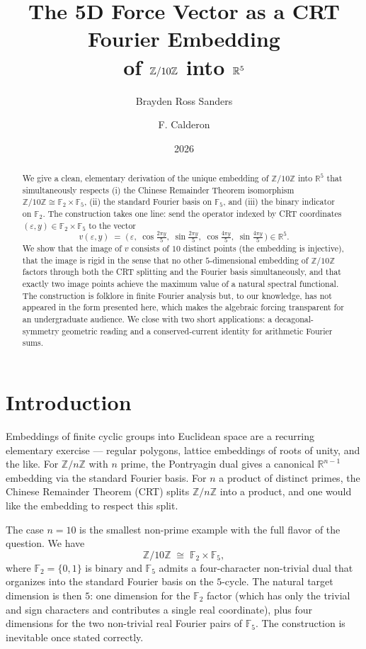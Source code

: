 \documentclass[11pt,reqno]{amsart}
\title[5D Fourier Embedding of \texorpdfstring{$\Z/10\Z$}{Z/10Z}]
  {The 5D Force Vector as a CRT Fourier Embedding\\
   of $\Z/10\Z$ into $\R^5$}
\author{Brayden Ross Sanders}
\author{F. Calderon}
\date{2026}
\theoremstyle{definition}
\newcommand{\Z}{\mathbb{Z}}
\newcommand{\R}{\mathbb{R}}
\newcommand{\F}{\mathbb{F}}
\begin{document}
\begin{abstract}
We give a clean, elementary derivation of the unique embedding of
$\Z/10\Z$ into $\R^5$ that simultaneously respects (i) the Chinese
Remainder Theorem isomorphism $\Z/10\Z \cong \F_2 \times \F_5$, (ii)
the standard Fourier basis on $\F_5$, and (iii) the binary indicator
on $\F_2$. The construction takes one line: send the operator
indexed by CRT coordinates $(\varepsilon, y) \in \F_2 \times \F_5$
to the vector
\[ v(\varepsilon, y) \;=\;
   \bigl(\,\varepsilon,\;
   \cos\tfrac{2\pi y}{5},\;\sin\tfrac{2\pi y}{5},\;
   \cos\tfrac{4\pi y}{5},\;\sin\tfrac{4\pi y}{5}\,\bigr) \in \R^5. \]
We show that the image of $v$ consists of $10$ distinct points (the
embedding is injective), that the image is rigid in the sense that
no other $5$-dimensional embedding of $\Z/10\Z$ factors through both
the CRT splitting and the Fourier basis simultaneously, and that
exactly two image points achieve the maximum value of a natural
spectral functional. The construction is folklore in finite Fourier
analysis but, to our knowledge, has not appeared in the form
presented here, which makes the algebraic forcing transparent for an
undergraduate audience. We close with two short applications: a
decagonal-symmetry geometric reading and a conserved-current
identity for arithmetic Fourier sums.
\end{abstract}

\maketitle

\section{Introduction}
\label{sec:intro}

Embeddings of finite cyclic groups into Euclidean space are a
recurring elementary exercise --- regular polygons, lattice
embeddings of roots of unity, and the like. For $\Z/n\Z$ with
$n$ prime, the Pontryagin dual gives a canonical $\R^{n-1}$
embedding via the standard Fourier basis. For $n$ a product of
distinct primes, the Chinese Remainder Theorem (CRT) splits
$\Z/n\Z$ into a product, and one would like the embedding to
respect this split.

The case $n = 10$ is the smallest non-prime example with the full
flavor of the question. We have
\[
  \Z/10\Z \;\cong\; \F_2 \times \F_5,
\]
where $\F_2 = \{0,1\}$ is binary and $\F_5$ admits a four-character
non-trivial dual that organizes into the standard Fourier basis on
the $5$-cycle. The natural target dimension is then $5$: one
dimension for the $\F_2$ factor (which has only the trivial and
sign characters and contributes a single real coordinate), plus
four dimensions for the two non-trivial real Fourier pairs of
$\F_5$. The construction is inevitable once stated correctly.
\end{document}

